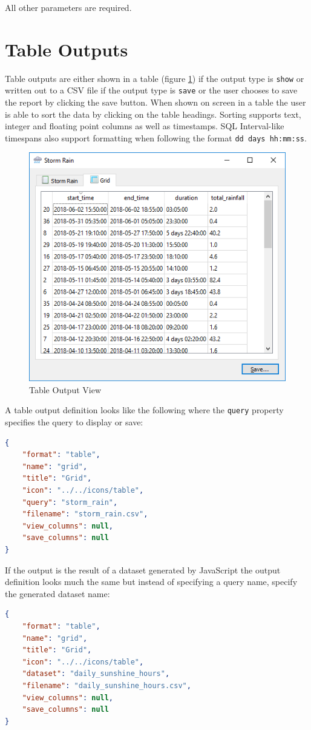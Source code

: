 \documentclass[a4paper,10pt]{book}
\begin{document}
All other parameters are required.

\section{Table Outputs}
Table outputs are either shown in a table (figure \ref{img_table_output}) if the output type is \verb|show| or written out to a CSV file if the output type is \verb|save| or the user chooses to save the report by clicking the save button. When shown on screen in a table the user is able to sort the data by clicking on the table headings. Sorting supports text, integer and floating point columns as well as timestamps. SQL Interval-like timespans also support formatting when following the format \verb|dd days hh:mm:ss|.

\begin {figure}[!ht]
 \centering
 \includegraphics[scale=0.5]{images/table_output}
 \caption{Table Output View}
 \label{img_table_output}
\end {figure}

A table output definition looks like the following where the \verb|query| property specifies the query to display or save:
\begin{lstlisting}[language=json]
{
	"format": "table",
	"name": "grid",
	"title": "Grid",
	"icon": "../../icons/table",
	"query": "storm_rain",
	"filename": "storm_rain.csv",
	"view_columns": null,
	"save_columns": null        
}
\end{lstlisting}
If the output is the result of a dataset generated by JavaScript the output definition looks much the same but instead of specifying a query name, specify the generated dataset name:
\begin{lstlisting}[language=json]
{
	"format": "table",
	"name": "grid",
	"title": "Grid",
	"icon": "../../icons/table",
	"dataset": "daily_sunshine_hours",
	"filename": "daily_sunshine_hours.csv",
	"view_columns": null,
	"save_columns": null        
}
\end{lstlisting}
\end{document}
